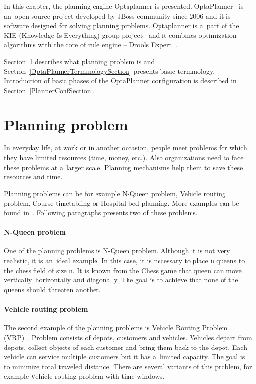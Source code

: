 In this chapter, the planning engine Optaplanner is presented. OptaPlanner~\cite{OptaPlannerPages, DroolsBook} is
an~open-source project developed by JBoss community since 2006 and it is software designed for solving planning
problems. Optaplanner is a~part of the KIE (Knowledge Is Everything) group project~\cite{Kie, Drools} and it combines
optimization algorithms with the core of rule engine -- Drools Expert~\cite{Drools}.

Section~\ref{PlanningProblemSection} describes what planning problem is and Section~\ref{OptaPlannerTerminologySection}
presents basic terminology. Introduction of basic phases of the OptaPlanner configuration is described in
Section~\ref{PlannerConfSection}.

\section{Planning problem}\label{PlanningProblemSection}
In everyday life, at work or in another occasion, people meet problems for which they have limited resources (time,
money, etc.). Also organizations need to face these problems at a~larger scale. Planning mechanisms help them to save
these resources and time.

Planning problems can be for example N-Queen problem, Vehicle routing problem, Course timetabling or Hospital bed
planning. More examples can be found in~\cite{OptaPlannerDoc}. Following paragraphs presents two of these problems.

\paragraph{N-Queen problem}
One of the planning problems is N-Queen problem. Although it is not very realistic, it is an~ideal example. In this
case, it is necessary to place \texttt{n} queens to the chess field of size \texttt{n}. It is known from the Chess game
that queen can move vertically, horizontally and diagonally. The goal is to achieve that none of the queens should
threaten another.

\paragraph{Vehicle routing problem}
The second example of the planning problems is Vehicle Routing Problem (VRP)~\cite{VehicleRouting}. Problem consists of
depots, customers and vehicles. Vehicles depart from depots, collect objects of each customer and bring them back to
the depot. Each vehicle can service multiple customers but it has a~limited capacity. The goal is to minimize total
traveled distance. There are several variants of this problem, for example Vehicle routing problem with time windows.

